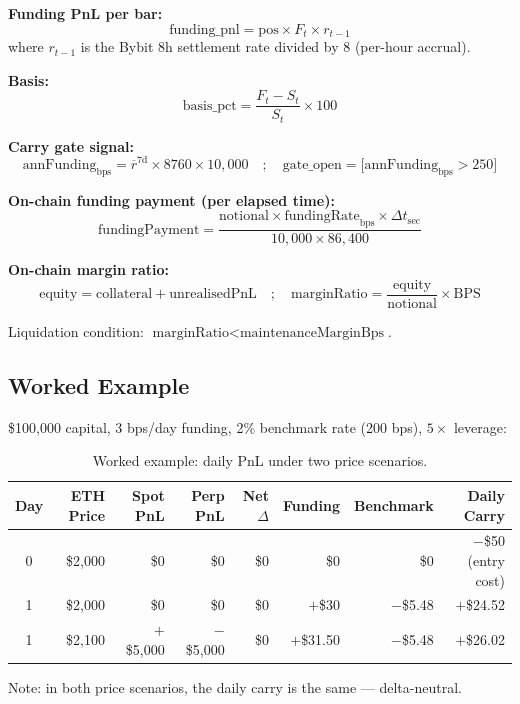 \documentclass[11pt,a4paper]{article}
\begin{document}
\textbf{Funding PnL per bar:}
\[
    \text{funding\_pnl} = \text{pos} \times F_t \times r_{t-1}
\]
where $r_{t-1}$ is the Bybit 8h settlement rate divided by 8 (per-hour accrual).

\textbf{Basis:}
\[
    \text{basis\_pct} = \frac{F_t - S_t}{S_t} \times 100
\]

\textbf{Carry gate signal:}
\[
    \text{annFunding}_{\text{bps}} = \overline{r}^{7\text{d}} \times 8760 \times 10{,}000
    \quad;\quad
    \text{gate\_open} = \bigl[\text{annFunding}_{\text{bps}} > 250\bigr]
\]

\textbf{On-chain funding payment (per elapsed time):}
\[
    \text{fundingPayment} = \frac{\text{notional} \times \text{fundingRate}_{\text{bps}}
                                   \times \Delta t_{\text{sec}}}{10{,}000 \times 86{,}400}
\]

\textbf{On-chain margin ratio:}
\[
    \text{equity} = \text{collateral} + \text{unrealisedPnL}
    \quad;\quad
    \text{marginRatio} = \frac{\text{equity}}{\text{notional}} \times \text{BPS}
\]

Liquidation condition: $\text{marginRatio} < \text{maintenanceMarginBps}$.

\subsection{Worked Example}

\$100,000 capital, 3 bps/day funding, 2\% benchmark rate (200 bps), $5\times$ leverage:

\begin{table}[h!]
\centering
\caption{Worked example: daily PnL under two price scenarios.}
\begin{tabular}{@{}crrrrrrr@{}}
\toprule
\textbf{Day} & \textbf{ETH Price} & \textbf{Spot PnL} & \textbf{Perp PnL} & \textbf{Net $\Delta$} & \textbf{Funding} & \textbf{Benchmark} & \textbf{Daily Carry} \\
\midrule
0 & \$2,000 & \$0       & \$0        & \$0 & \$0     & \$0     & $-$\$50 (entry cost) \\
1 & \$2,000 & \$0       & \$0        & \$0 & $+$\$30 & $-$\$5.48 & $+$\$24.52 \\
1 & \$2,100 & $+$\$5,000 & $-$\$5,000 & \$0 & $+$\$31.50 & $-$\$5.48 & $+$\$26.02 \\
\bottomrule
\end{tabular}
\end{table}

Note: in both price scenarios, the daily carry is the same --- delta-neutral.
\end{document}
